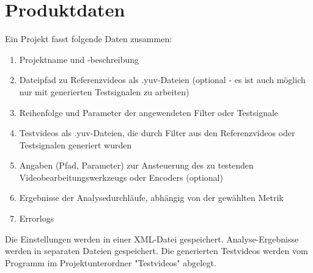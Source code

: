 

\chapter{Produktdaten}
Ein Projekt fasst folgende Daten zusammen:
	\begin{enumerate}
	        \item Projektname und -beschreibung
		\item Dateipfad zu Referenzvideos als .yuv-Dateien (optional - es ist auch möglich nur mit generierten Testsignalen zu arbeiten)
		\item Reihenfolge und Parameter der angewendeten Filter oder Testsignale
	        \item Testvideos als .yuv-Dateien, die durch Filter aus den Referenzvideos oder Testsignalen generiert wurden
	        \item Angaben (Pfad, Parameter) zur Ansteuerung des zu testenden Videobearbeitungswerkzeugs oder Encoders (optional)
		\item Ergebnisse der Analysedurchläufe, abhängig von der gewählten Metrik
		\item Errorlogs
	\end{enumerate}
Die Einstellungen werden in einer XML-Datei gespeichert. Analyse-Ergebnisse werden in separaten Dateien gespeichert. Die generierten Testvideos werden vom Programm im Projektunterordner "Testvideos" abgelegt.


